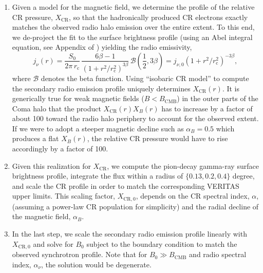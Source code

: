 \documentclass[12pt,manuscript]{aastex}
\newcommand{\rmn}{\mathrm}
\newcommand{\CR}{\mathrm{CR}}
\begin{document}
\begin{enumerate}
\item Given a model for the magnetic field, we determine the profile of the relative CR pressure, $X_{\CR}$, so that the hadronically produced CR electrons exactly matches the observed radio halo emission over the entire extent. To this end, we de-project the fit to the surface brightness profile (using an Abel integral equation, see Appendix of \citealt{article:PfrommerEnsslin:2004b}) yielding the radio emissivity,
\begin{equation}
\label{eq:Coma:radio}
j_{\nu} (r) = \frac{S_{0}}{2\pi\, r_{\rmn{c}}}\,
\frac{6\beta - 1}{\left(1 + r^{2}/r_{\rmn{c}}^{2}\right)^{3 \beta}}\,
\mathcal{B}\left(\frac{1}{2}, 3\beta\right)
= j_{\nu,0} \left(1 + r^2/r_{\rmn{c}}^{2}\right)^{-3 \beta},
\end{equation}
where $\mathcal{B}$ denotes the beta function. Using ``isobaric CR model'' to compute the secondary radio emission profile uniquely determines $X_\CR(r)$. It is generically true for weak magnetic fields ($B<B_{\rmn{CMB}}$) in the outer parts of the Coma halo that the product $X_{\CR}(r)X_{B}(r)$ has to increase by a factor of about 100 toward the radio halo periphery to account for the observed extent. If we were to adopt a steeper magnetic decline such as $\alpha_{B}=0.5$ which produces a flat $X_{B}(r)$, the relative CR pressure would have to rise accordingly by a factor of 100.

\item Given this realization for $X_{\CR}$, we compute the pion-decay gamma-ray surface brightness profile, integrate the flux within a radius of $\{0.13, 0.2, 0.4\}$ degree, and scale the CR profile in order to match the corresponding VERITAS upper limits. This scaling factor, $X_{\CR,0}$, depends on the CR spectral index, $\alpha$, (assuming a power-law CR population for simplicity) and the radial decline of the magnetic field, $\alpha_{B}$.

\item In the last step, we scale the secondary radio emission profile linearly with $X_{\CR,0}$ and solve for $B_{0}$ subject to the boundary condition to match the observed synchrotron profile. Note that for $B_{0} \gg B_{\rmn{CMB}}$ and radio spectral index, $\alpha_{\nu}$, the solution would be degenerate.
\end{enumerate}
\end{document}
